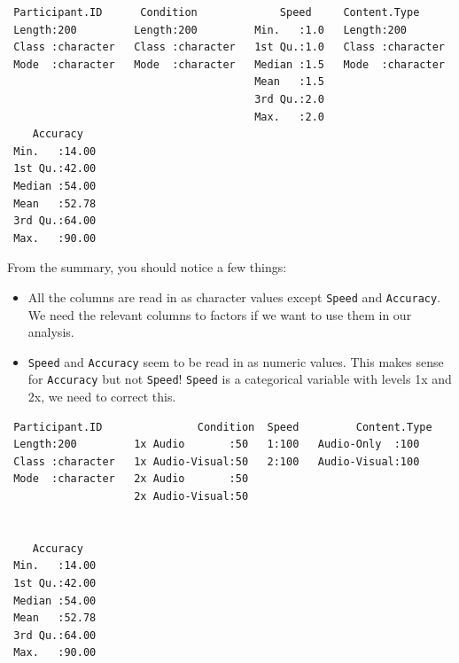 \documentclass[
  letterpaper,
]{book}
\newenvironment{Shaded}{\begin{snugshade}}{\end{snugshade}}
\newcommand{\FunctionTok}[1]{\textcolor[rgb]{0.13,0.29,0.53}{\textbf{#1}}}
\newcommand{\NormalTok}[1]{#1}
\newcommand{\OtherTok}[1]{\textcolor[rgb]{0.56,0.35,0.01}{#1}}
\newcommand{\SpecialCharTok}[1]{\textcolor[rgb]{0.81,0.36,0.00}{\textbf{#1}}}
\begin{document}
\begin{verbatim}
 Participant.ID      Condition             Speed     Content.Type      
 Length:200         Length:200         Min.   :1.0   Length:200        
 Class :character   Class :character   1st Qu.:1.0   Class :character  
 Mode  :character   Mode  :character   Median :1.5   Mode  :character  
                                       Mean   :1.5                     
                                       3rd Qu.:2.0                     
                                       Max.   :2.0                     
    Accuracy    
 Min.   :14.00  
 1st Qu.:42.00  
 Median :54.00  
 Mean   :52.78  
 3rd Qu.:64.00  
 Max.   :90.00  
\end{verbatim}

From the summary, you should notice a few things:

\begin{itemize}
\item
  All the columns are read in as character values except \texttt{Speed}
  and \texttt{Accuracy}. We need the relevant columns to factors if we
  want to use them in our analysis.
\item
  \texttt{Speed} and \texttt{Accuracy} seem to be read in as numeric
  values. This makes sense for \texttt{Accuracy} but not \texttt{Speed}!
  \texttt{Speed} is a categorical variable with levels 1x and 2x, we
  need to correct this.
\end{itemize}

\begin{Shaded}
\end{Shaded}

\begin{verbatim}
 Participant.ID               Condition  Speed         Content.Type
 Length:200         1x Audio       :50   1:100   Audio-Only  :100  
 Class :character   1x Audio-Visual:50   2:100   Audio-Visual:100  
 Mode  :character   2x Audio       :50                             
                    2x Audio-Visual:50                             
                                                                   
                                                                   
    Accuracy    
 Min.   :14.00  
 1st Qu.:42.00  
 Median :54.00  
 Mean   :52.78  
 3rd Qu.:64.00  
 Max.   :90.00  
\end{verbatim}
\end{document}
